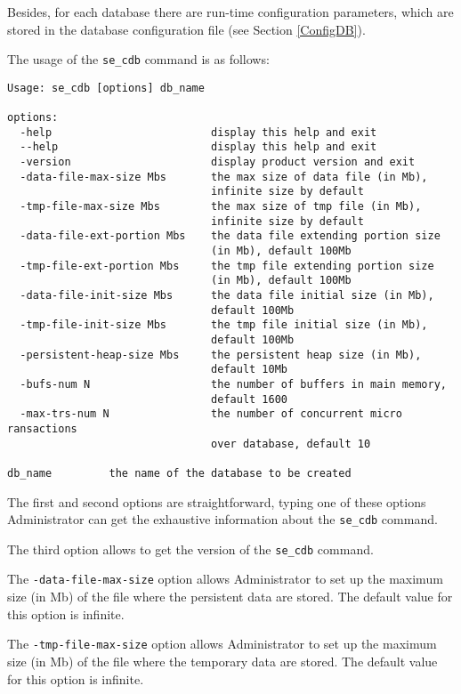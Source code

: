 \documentclass[a4paper,12pt]{article}
\begin{document}
Besides, for each database there are run-time configuration parameters, which are stored in the database configuration file (see Section \ref{ConfigDB}).

The usage of the \verb!se_cdb! command is as follows:

\begin{verbatim}
Usage: se_cdb [options] db_name

options:
  -help                         display this help and exit
  --help                        display this help and exit
  -version                      display product version and exit
  -data-file-max-size Mbs       the max size of data file (in Mb),
                                infinite size by default
  -tmp-file-max-size Mbs        the max size of tmp file (in Mb),
                                infinite size by default
  -data-file-ext-portion Mbs    the data file extending portion size 
                                (in Mb), default 100Mb
  -tmp-file-ext-portion Mbs     the tmp file extending portion size
                                (in Mb), default 100Mb
  -data-file-init-size Mbs      the data file initial size (in Mb),
                                default 100Mb
  -tmp-file-init-size Mbs       the tmp file initial size (in Mb),
                                default 100Mb
  -persistent-heap-size Mbs     the persistent heap size (in Mb),
                                default 10Mb
  -bufs-num N                   the number of buffers in main memory,
                                default 1600
  -max-trs-num N                the number of concurrent micro ransactions
                                over database, default 10

db_name         the name of the database to be created
\end{verbatim}


The first and second options are straightforward, typing one of these options Administrator can get the exhaustive information about the \verb!se_cdb! command.

The third option allows to get the version of the \verb!se_cdb! command.

The \verb!-data-file-max-size! option allows Administrator to set up the maximum size (in Mb) of the file where the persistent data are stored. The default value for this option is infinite.

The \verb!-tmp-file-max-size! option allows Administrator to set up the maximum size (in Mb) of the file where the temporary data are stored. The default value for this option is infinite.
\end{document}
